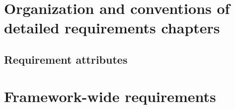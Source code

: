 \documentclass[english]{article}
\newcommand{\shortname}{GR}
\begin{document}
\newpage








\section{Organization and conventions of detailed requirements chapters}


\subsection{Requirement attributes}


\newpage

\begin{htmlonly}
\end{htmlonly}
\section{Framework-wide requirements}

\setcounter{section}{0}
\renewcommand{\thesection}{\shortname\arabic{section}}
\renewcommand{\thesubsection}{\shortname\arabic{section}.\arabic{subsection}}
\renewcommand{\thesubsubsection}{\shortname\arabic{section}.\arabic{subsection}.\arabic{subsubsection}}



 

\end{document}
